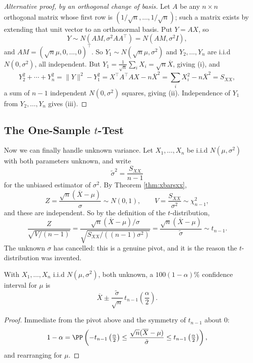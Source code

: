 \begin{proof}[Alternative proof, by an orthogonal change of basis]
  Let $A$ be any $n\times n$ orthogonal matrix whose first row is $(1/\sqrt n, \dots, 1/\sqrt n)$; such a matrix exists by extending that unit vector to an orthonormal basis. Put $Y = AX$, so
  $$
  Y \sim N\left(A M, \sigma^2 A A^\top\right) = N\left(AM, \sigma^2 I\right),
  $$
  and $AM = (\sqrt n \mu, 0,\dots,0)^\top$. So $Y_1 \sim N(\sqrt n\mu,\sigma^2)$ and $Y_2,\dots,Y_n$ are i.i.d $N(0,\sigma^2)$, all independent. But $Y_1 = \frac{1}{\sqrt n}\sum_i X_i = \sqrt n \overline{X}$, giving (i), and
  $$
  Y_2^2 + \cdots + Y_n^2 = \|Y\|^2 - Y_1^2 = X^\top A^\top A X - n\overline{X}^2 = \sum_i X_i^2 - n\overline{X}^2 = S_{XX},
  $$
  a sum of $n-1$ independent $N(0,\sigma^2)$ squares, giving (ii). Independence of $Y_1$ from $Y_2,\dots,Y_n$ gives (iii).
\end{proof}

\subsection{The One-Sample \texorpdfstring{$t$}{t}-Test}

Now we can finally handle unknown variance. Let $X_1,\dots,X_n$ be i.i.d $N(\mu,\sigma^2)$ with both parameters unknown, and write
$$
\tilde\sigma^2 = \frac{S_{XX}}{n-1}
$$
for the unbiased estimator of $\sigma^2$. By Theorem \ref{thm:xbarsxx},
$$
Z = \frac{\sqrt n\left(\overline{X}-\mu\right)}{\sigma} \sim N(0,1), \qquad V = \frac{S_{XX}}{\sigma^2}\sim\chi^2_{n-1},
$$
and these are independent. So by the definition of the $t$-distribution,
$$
\frac{Z}{\sqrt{V/(n-1)}} = \frac{\sqrt n\left(\overline{X}-\mu\right)/\sigma}{\sqrt{S_{XX}/\left((n-1)\sigma^2\right)}} = \frac{\sqrt{n}\left(\overline{X}-\mu\right)}{\tilde\sigma} \sim t_{n-1}.
$$
The unknown $\sigma$ has cancelled: this is a genuine pivot, and it is the reason the $t$-distribution was invented.

\begin{proposition}
  With $X_1,\dots,X_n$ i.i.d $N(\mu,\sigma^2)$, both unknown, a $100(1-\alpha)\%$ confidence interval for $\mu$ is
  $$
  \overline{X} \pm \frac{\tilde\sigma}{\sqrt n}\, t_{n-1}\!\left(\frac{\alpha}{2}\right).
  $$
\end{proposition}
\begin{proof}
  Immediate from the pivot above and the symmetry of $t_{n-1}$ about $0$:
  $$
  1 - \alpha = \PP\left(-t_{n-1}\left(\tfrac{\alpha}{2}\right)\leq \frac{\sqrt n(\overline{X}-\mu)}{\tilde\sigma}\leq t_{n-1}\left(\tfrac{\alpha}{2}\right)\right),
  $$
  and rearranging for $\mu$.
\end{proof}

